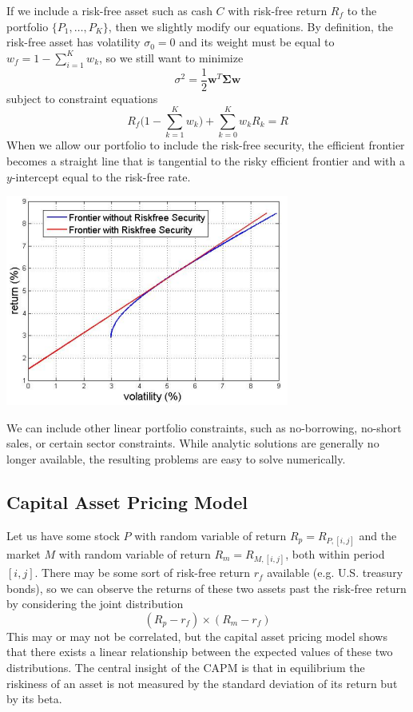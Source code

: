 \documentclass{article}
\begin{document}
If we include a risk-free asset such as cash $C$ with risk-free return $R_f$ to the portfolio $\{P_1, \ldots, P_K\}$, then we slightly modify our equations. By definition, the risk-free asset has volatility $\sigma_0 = 0$ and its weight must be equal to $w_f = 1 - \sum_{i=1}^K w_k$, so we still want to minimize 
\[\sigma^2 = \frac{1}{2} \mathbf{w}^T \boldsymbol{\Sigma} \mathbf{w}\]
subject to constraint equations 
\[R_f \bigg( 1 - \sum_{k=1}^K w_k \bigg) + \sum_{k=0}^K w_k R_k = R\]
When we allow our portfolio to include the risk-free security, the efficient frontier becomes a straight line that is tangential to the risky efficient frontier and with a $y$-intercept equal to the risk-free rate. 
\begin{center}
    \includegraphics[scale=0.65]{img/Frontier_with_Risk_Free_Sec.png}
\end{center}
We can include other linear portfolio constraints, such as no-borrowing, no-short sales, or certain sector constraints. While analytic solutions are generally no longer available, the resulting problems are easy to solve numerically. 


\subsection{Capital Asset Pricing Model}

Let us have some stock $P$ with random variable of return $R_p = R_{P, [i, j]}$ and the market $M$ with random variable of return $R_m = R_{M, [i, j]}$, both within period $[i, j]$. There may be some sort of risk-free return $r_f$ available (e.g. U.S. treasury bonds), so we can observe the returns of these two assets past the risk-free return by considering the joint distribution 
\[(R_p - r_f) \times (R_m - r_f)\]
This may or may not be correlated, but the capital asset pricing model shows that there exists a linear relationship between the expected values of these two distributions. The central insight of the CAPM is that in equilibrium the riskiness of an asset is not measured by the standard deviation of its return but by its beta. 
\end{document}
